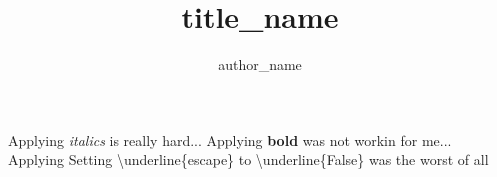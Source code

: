 \documentclass{article}%
\title{title\_name}%
\author{author\_name}%
\begin{document}
%
\normalsize%
\maketitle%
Applying%
\textit{ italics }%
is really hard...%
\newline%
Applying%
\textbf{ bold }%
was not workin for me...%
\newline%
Applying%
Setting \textbackslash{}underline\{escape\} to \textbackslash{}underline\{False\} %
was the worst of all%
\end{document}
